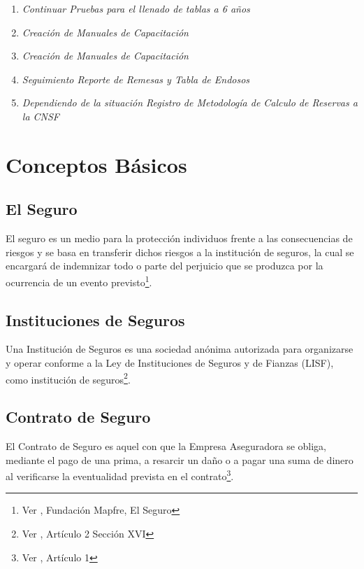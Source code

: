 \documentclass[11pt,twoside,openright,spanish]{report}
\numberwithin{equation}{chapter}
\numberwithin{figure}{chapter}
\numberwithin{table}{chapter}
\begin{document}
\begin{singlespace}
\begin{enumerate}
\begin{enumerate}
	\item \textit{Continuar Pruebas para el llenado de tablas a 6 años} \\
	\item \textit{Creación de Manuales de Capacitación} \\
	\item \textit{Creación de Manuales de Capacitación} \\
	\item \textit{Seguimiento Reporte de Remesas y Tabla de Endosos} \\
	\item \textit{Dependiendo de la situación Registro de Metodología de Calculo de Reservas a la CNSF} \\
\end{enumerate}
\end{enumerate}
\end{singlespace}



	\chapter{Conceptos Básicos}

	\section{El Seguro}
	El seguro es un medio para la protección individuos frente a las consecuencias de riesgos y se basa en transferir dichos riesgos a la institución de seguros, la cual se encargará de indemnizar todo o parte del perjuicio que se produzca por la ocurrencia de un evento previsto\footnote{Ver \citet{ASeguro}, Fundación Mapfre, El Seguro}.
	
	\section{Instituciones de Seguros}

	Una Institución de Seguros es una sociedad anónima autorizada para organizarse y operar conforme a la Ley de Instituciones de Seguros y de Fianzas (LISF), como institución de seguros\footnote{Ver \citet{BAseguradora}, Artículo 2 Sección XVI}.

 
	
	\section{Contrato de Seguro}
	
	El Contrato de Seguro es aquel con que la Empresa Aseguradora se obliga, mediante el pago de una prima, a resarcir un daño o a pagar una suma de dinero al verificarse la eventualidad prevista en el contrato\footnote{Ver \citet{CContrato}, Artículo 1}.
	
\end{document}
